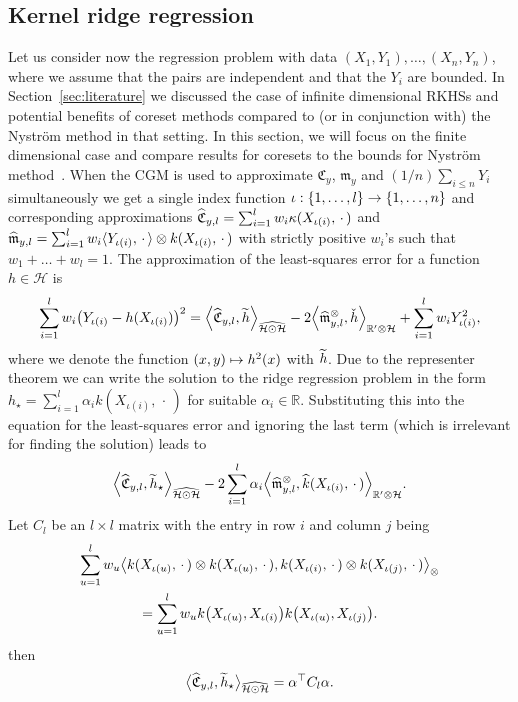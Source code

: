 \documentclass[10pt]{amsart}
\theoremstyle{definition}\newtheorem{defi}[theo]{Definition}\newtheorem{rema}[theo]{Remark}\newtheorem{exam}[theo]{Example}\newtheorem{exem}[theo]{Example}\newtheorem{nota}[theo]{Notation}
\theoremstyle{remark}
\newcommand{\R}{\mathbb{R}}
\newcommand{\dR}{{\R'}}
\newcommand{\cH}{\mathcal{H}}
\newcommand{\fkC}{\mathfrak{C}}
\newcommand{\mean}{\mathfrak{m}}
\let\oldtilde\tilde
\renewcommand*{\tilde}[1]{\mathchoice{\widetilde{#1}}{\widetilde{#1}}{\oldtilde{#1}}{\oldtilde{#1}}}
\let\oldhat\hat
\renewcommand*{\hat}[1]{\mathchoice{\widehat{#1}}{\widehat{#1}}{\oldhat{#1}}{\oldhat{#1}}}
\renewcommand*{\to}{\mathchoice{\longrightarrow}{\rightarrow}{\rightarrow}{\rightarrow}}
\let\oldmapsto\mapsto
\renewcommand*{\mapsto}{\mathchoice{\longmapsto}{\oldmapsto}{\oldmapsto}{\oldmapsto}}
\let\originalleft\left
\let\originalright\right
\renewcommand{\left}{\mathopen{}\mathclose\bgroup\originalleft}
\renewcommand{\right}{\aftergroup\egroup\originalright}
\begin{document}
\subsection{Kernel ridge regression} Let us consider now the regression problem with data $(X_1,Y_1), \dots, (X_n,Y_n)$, where we assume that the pairs are independent and that the $Y_i$ are bounded. In Section~\ref{sec:literature} we discussed the case of infinite dimensional RKHSs and potential benefits of coreset methods compared to (or in conjunction with) the Nystr\"om method in that setting. In this section, we will focus on the finite dimensional case and compare results for coresets to the bounds for Nystr\"om method~\cite{LI23}. When the CGM is used to approximate $\fkC_y$, $\mean_y$ and $(1/n) \sum_{i\leq n} Y_i$ simultaneously we get a single index function $\iota:\{1,\dots,l\} \to \{1,\dots,n\}$ and corresponding approximations $\hat{\fkC}_{y,l} = \sum_{i=1}^l w_i \kappa(X_{\iota(i)}, \,\cdot\,)$ and $\hat{\mean}_{y,l} = \sum_{i=1}^l w_i \langle Y_{\iota(i)}, \,\cdot\,\rangle \otimes k(X_{\iota(i)},\,\cdot\,)$ with strictly positive $w_i$'s such that $w_1+\dots + w_l = 1$. The approximation of the least-squares error for a function $h \in \cH$ is
\begin{align*}
\sum_{i=1}^l w_i \left(Y_{\iota(i)} - h(X_{\iota(i)})\right)^2 = \left\langle \hat{\fkC}_{y,l}, \tilde h \right\rangle_{\widehat{\cH \odot \cH}} - 2 \left\langle \hat \mean^{\otimes}_{y,l}, \check{h} \right\rangle_{\dR \otimes \cH} + \sum_{i=1}^l w_i Y_{\iota(i)}^2,
\end{align*}
where we denote the function $(x,y) \mapsto h^2(x)$ with $\tilde h$. Due to the representer theorem we can write the solution to the ridge regression problem in the form $h_\star = \sum_{i=1}^l \alpha_i k(X_{\iota(i)}, \,\cdot\,)$ for suitable $\alpha_i \in \R$. Substituting this into the equation for the least-squares error and ignoring the last term (which is irrelevant for finding the solution) leads to
\begin{align*}
\left\langle \hat{\fkC}_{y,l}, \tilde{h}_\star \right\rangle_{\widehat{\cH \odot \cH}} - 2 \sum_{i=1}^l \alpha_i \left\langle \hat{\mean}^\otimes_{y,l}, \hat k(X_{\iota(i)},\,\cdot\,) \right\rangle_{\dR \otimes \cH}.
\end{align*}
Let $C_l$ be an $l\times l$ matrix with the entry in row $i$ and column $j$ being
\begin{multline*}
\sum_{u=1}^l w_u \bigl\langle k(X_{\iota(u)},\,\cdot\,)\otimes k(X_{\iota(u)},\,\cdot\,),k(X_{\iota(i)},\,\cdot\,)\otimes k(X_{\iota(j)},\,\cdot\,) \bigr\rangle_\otimes \\
= \sum_{u=1}^l w_u k\left(X_{\iota(u)},X_{\iota(i)}\right) k\left(X_{\iota(u)},X_{\iota(j)}\right).
\end{multline*}
then
\[
\bigl\langle \hat{\fkC}_{y,l}, \tilde{h}_\star \bigr\rangle_{\widehat{\cH \odot \cH}} = \alpha^\top C_l \alpha.
\]
\end{document}
